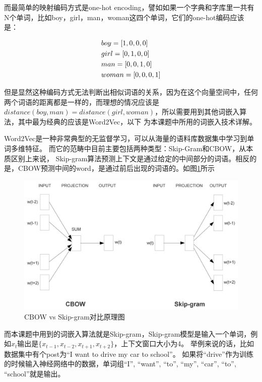 \documentclass[supercite]{HustGraduPaper}
\theoremstyle{definition}
\begin{document}
而最简单的映射编码方式是one-hot encoding，譬如如果一个字典和字库里一共有N个单词，比如boy，girl，man，woman这四个单词，它们的one-hot编码应该是：

\begin{align}
  &boy = [1,0,0,0]\notag\\
  &girl = [0,1,0,0]\notag\\
  &man = [0,0,1,0]\notag\\
  &woman = [0,0,0,1]\notag
\end{align}


但是显然这种编码方式无法判断出相似词语的关系，因为在这个向量空间中，任何两个词语的距离都是一样的，而理想的情况应该是
$distance(boy, man) = distance(girl, woman)$，所以需要用到其他词嵌入算法，其中最为经典的应该是Word2Vec，以下
为本课题中所用的词嵌入技术详解。

Word2Vec是一种非常典型的无监督学习，可以从海量的语料库数据集中学习到单词多维特征。
而它的范畴中目前主要包括两种类型：Skip-Gram\cite{guthrie2006closer}和CBOW，从本质区别上来说，
Skip-gram算法预测上下文是通过给定的中间部分的词语。相反的是，CBOW预测中间的word，是通过前后出现的词语的。如图\ref{Fig.word2vec}所示

\begin{figure}[htbp] %
  \centering %
  \includegraphics[width=1\textwidth]{images/word2vec.jpg} %
  \caption{CBOW vs Skip-gram对比原理图} %
  \label{Fig.word2vec} %
\end{figure}

而本课题中用到的词嵌入算法就是Skip-gram，Skip-gram模型是输入一个单词，例如$x_t$输出是$\{x_{t-1},x_{t-2},x_{t+1},x_{t+2}\}$，上下文窗口大小为4。
举例来说的话，比如数据集中有个post为“I want to drive my car to school”。
如果将“drive”作为训练的时候输入神经网络中的数据，单词组{“I”, “want”, “to”, “my”, “car”, “to”, “school”}就是输出。
\end{document}
